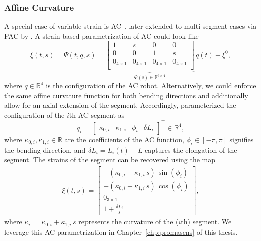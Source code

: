 \subsubsection{Affine Curvature}
A special case of variable strain is \gls{AC}~\citep{della2020soft, stella2022experimental, tiburzio2025model}, later extended to multi-segment cases via \gls{PAC} by \citet{stella2023piecewise}.
A strain-based parametrization of \gls{AC} could look like
\begin{equation}
    \xi(t,s) = \Psi(t,q,s) = \underbrace{\begin{bmatrix}
        1 & s & 0 & 0\\
        0 & 0 & 1 & s\\
        0_{4 \times 1} & 0_{4 \times 1} & 0_{4 \times 1} & 0_{4 \times 1}\\
    \end{bmatrix}}_{\Phi(s) \in \mathbb{R}^{6 \times 4}} \, q(t) + \xi^0,
\end{equation}
where $q \in \mathbb{R}^4$ is the configuration of the \gls{AC} robot.
Alternatively, we could enforce the same affine curvature function for both bending directions and additionally allow for an axial extension of the segment. Accordingly, \citet{stella2023piecewise, baaij2023learning} parameterized the configuration of the $i$th \gls{AC} segment as
\begin{equation}
    q_i = \begin{bmatrix}\kappa_{0,i} & \kappa_{1,i} & \phi_i & \delta L_{i} \end{bmatrix}^{\top} \in \mathbb{R}^4,    
\end{equation}
where $\kappa_{0,i}, \kappa_{1,i} \in \mathbb{R}$ are the coefficients of the \gls{AC} function, $\phi_i \in [-\pi, \pi]$ signifies the bending direction, and $\delta L_i = L_i(t) - L$ captures the elongation of the segment.
The strains of the segment can be recovered using the map
\begin{equation}
\begin{split}
    \xi(t,s) = \begin{bmatrix}
        - \left ( \kappa_{0,i} + \kappa_{1,i} \, s \right ) \, \sin(\phi_i)\\
        +\left ( \kappa_{0,i} + \kappa_{1,i} \, s \right ) \, \cos(\phi_i)\\
        0_{3\times1}\\
        1 + \frac{\delta L_i}{s}
    \end{bmatrix},
\end{split}
\end{equation}
where $\kappa_i = \: \kappa_{0,i} + \kappa_{1,i} \, s$ represents the curvature of the ($i$th) segment.
We leverage this \gls{AC} parametrization in Chapter~\ref{chp:promasens} of this thesis.